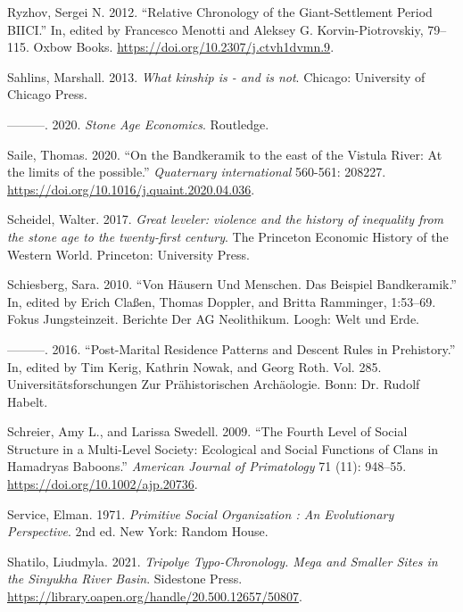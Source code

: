 \documentclass[
  12pt,
  a4paper, twoside]{book}
\newlength{\cslhangindent}
\newlength{\cslentryspacingunit} %
\newenvironment{CSLReferences}[2] %
 {%
  \setlength{\parindent}{0pt}
  \ifodd #1
  \let\oldpar\par
  \def\par{\hangindent=\cslhangindent\oldpar}
  \fi
  \setlength{\parskip}{#2\cslentryspacingunit}
 }%
 {}
\begin{document}
\begin{CSLReferences}{1}{0}
\leavevmode{}%
Ryzhov, Sergei N. 2012. {``Relative Chronology of the Giant-Settlement Period BII{\textendash}CI.''} In, edited by Francesco Menotti and Aleksey G. Korvin-Piotrovskiy, 79--115. Oxbow Books. \url{https://doi.org/10.2307/j.ctvh1dvmn.9}.

\leavevmode{}%
Sahlins, Marshall. 2013. \emph{What kinship is - and is not}. Chicago: University of Chicago Press.

\leavevmode{}%
---------. 2020. \emph{Stone Age Economics}. Routledge.

\leavevmode{}%
Saile, Thomas. 2020. {``On the Bandkeramik to the east of the Vistula River: At the limits of the possible.''} \emph{Quaternary international} 560-561: 208227. \url{https://doi.org/10.1016/j.quaint.2020.04.036}.

\leavevmode{}%
Scheidel, Walter. 2017. \emph{Great leveler: violence and the history of inequality from the stone age to the twenty-first century}. The Princeton Economic History of the Western World. Princeton: University Press.

\leavevmode{}%
Schiesberg, Sara. 2010. {``Von Häusern Und Menschen. Das Beispiel Bandkeramik.''} In, edited by Erich Claßen, Thomas Doppler, and Britta Ramminger, 1:53--69. Fokus Jungsteinzeit. Berichte Der AG Neolithikum. Loogh: Welt und Erde.

\leavevmode{}%
---------. 2016. {``Post-Marital Residence Patterns and Descent Rules in Prehistory.''} In, edited by Tim Kerig, Kathrin Nowak, and Georg Roth. Vol. 285. Universitätsforschungen Zur Prähistorischen Archäologie. Bonn: Dr. Rudolf Habelt.

\leavevmode{}%
Schreier, Amy L., and Larissa Swedell. 2009. {``The Fourth Level of Social Structure in a Multi-Level Society: Ecological and Social Functions of Clans in Hamadryas Baboons.''} \emph{American Journal of Primatology} 71 (11): 948--55. \url{https://doi.org/10.1002/ajp.20736}.

\leavevmode{}%
Service, Elman. 1971. \emph{Primitive Social Organization : An Evolutionary Perspective}. 2nd ed. New York: Random House.

\leavevmode{}%
Shatilo, Liudmyla. 2021. \emph{Tripolye Typo-Chronology. Mega and Smaller Sites in the Sinyukha River Basin}. Sidestone Press. \url{https://library.oapen.org/handle/20.500.12657/50807}.


\end{CSLReferences}
\end{document}

